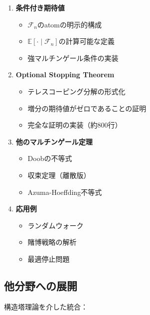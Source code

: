 \documentclass[a4paper,12pt]{ltjsarticle}
\theoremstyle{definition}
\begin{document}
\begin{enumerate}
\item \textbf{条件付き期待値}
  \begin{itemize}
    \item $\mathcal{F}_n$のatomの明示的構成
    \item $\mathbb{E}[\cdot \mid \mathcal{F}_n]$の計算可能な定義
    \item 強マルチンゲール条件の実装
  \end{itemize}

\item \textbf{Optional Stopping Theorem}
  \begin{itemize}
    \item テレスコーピング分解の形式化
    \item 増分の期待値がゼロであることの証明
    \item 完全な証明の実装（約800行）
  \end{itemize}

\item \textbf{他のマルチンゲール定理}
  \begin{itemize}
    \item Doobの不等式
    \item 収束定理（離散版）
    \item Azuma-Hoeffding不等式
  \end{itemize}

\item \textbf{応用例}
  \begin{itemize}
    \item ランダムウォーク
    \item 賭博戦略の解析
    \item 最適停止問題
  \end{itemize}
\end{enumerate}

\subsection{他分野への展開}

構造塔理論を介した統合：

\begin{center}
\end{center}
\end{document}
